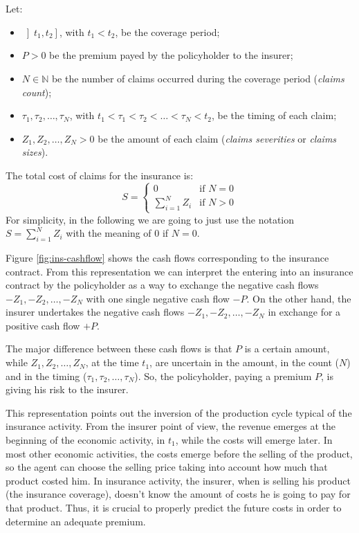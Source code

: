 \documentclass[a4paper, nobind]{templates/ociamthesis}
\theoremstyle{definition}
\theoremstyle{definition}
\theoremstyle{definition}
\theoremstyle{remark}
\begin{document}
Let:

\begin{itemize}
\item
  \(\left]t_1, t_2\right]\), with \(t_1<t_2\), be the coverage period;
\item
  \(P>0\) be the premium payed by the policyholder to the insurer;
\item
  \(N\in\mathbb{N}\) be the number of claims occurred during the coverage period (\emph{claims count});
\item
  \(\tau_1, \tau_2, \dots, \tau_N\), with \(t_1<\tau_1< \tau_2 < \dots < \tau_N<t_2\), be the timing of each claim;
\item
  \(Z_1, Z_2, \dots, Z_N > 0\) be the amount of each claim (\emph{claims severities} or \emph{claims sizes}).
\end{itemize}

The total cost of claims for the insurance is:
\[
S = 
\begin{cases}
  0                    & \text{if } N=0 \\
  \sum_{i=1}^{N}{Z_i}  & \text{if } N>0
\end{cases}
\]
For simplicity, in the following we are going to just use the notation \(S = \sum_{i=1}^{N}{Z_i}\) with the meaning of \(0\) if \(N=0\).

Figure \ref{fig:ins-cashflow} shows the cash flows corresponding to the insurance contract. From this representation we can interpret the entering into an insurance contract by the policyholder as a way to exchange the negative cash flows \(-Z_1, -Z_2, \dots, -Z_N\) with one single negative cash flow \(-P\). On the other hand, the insurer undertakes the negative cash flows \(-Z_1, -Z_2, \dots, -Z_N\) in exchange for a positive cash flow \(+P\).

The major difference between these cash flows is that \(P\) is a certain amount, while \(Z_1, Z_2, \dots, Z_N\), at the time \(t_1\), are uncertain in the amount, in the count (\(N\)) and in the timing (\(\tau_1, \tau_2, \dots, \tau_N\)). So, the policyholder, paying a premium \(P\), is giving his risk to the insurer.

This representation points out the inversion of the production cycle typical of the insurance activity. From the insurer point of view, the revenue emerges at the beginning of the economic activity, in \(t_1\), while the costs will emerge later. In most other economic activities, the costs emerge before the selling of the product, so the agent can choose the selling price taking into account how much that product costed him. In insurance activity, the insurer, when is selling his product (the insurance coverage), doesn't know the amount of costs he is going to pay for that product. Thus, it is crucial to properly predict the future costs in order to determine an adequate premium.
\end{document}

